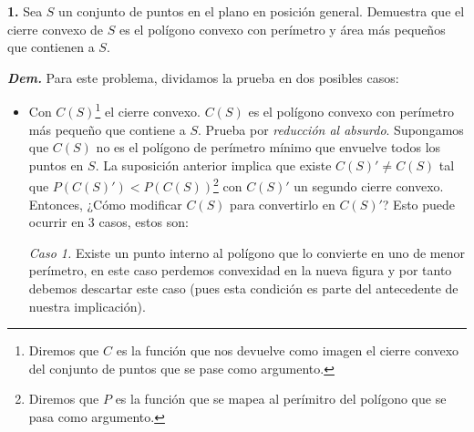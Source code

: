 \textbf{1.} Sea $S$ un conjunto de puntos en el plano en posición general. Demuestra que el
cierre convexo de $S$ es el polígono convexo con perímetro y área más pequeños que contienen a $S$.
\newline

\textbf{\textit{Dem.}} Para este problema, dividamos la prueba en dos posibles casos:
\begin{itemize}
\item Con $C(S)$\footnote{Diremos que $C$ es la función que nos devuelve como imagen el cierre convexo del conjunto de puntos
que se pase como argumento.} el cierre convexo. $C(S)$ es el polígono convexo con perímetro más pequeño que contiene a $S$.
  \newline
  Prueba por \textit{reducción al absurdo}. Supongamos que $C(S)$ no es el polígono de perímetro mínimo que envuelve
  todos los puntos en $S$. La suposición anterior implica que existe $C(S)' \not= C(S)$ tal que $P(C(S)') < P(C(S))$\footnote{Diremos
  que $P$ es la función que se mapea al perímitro del polígono que se pasa como argumento.} con $C(S)'$ un segundo cierre convexo. Entonces,
  ¿Cómo modificar $C(S)$ para convertirlo en $C(S)'$? Esto puede ocurrir en 3 casos, estos son:
  \newline
  
  \hspace*{0.5cm} \textit{Caso 1.} Existe un punto interno al polígono que lo convierte en uno de menor perímetro,
  en este caso perdemos convexidad en la nueva figura y por tanto debemos descartar este caso (pues esta condición es parte
  del antecedente de nuestra implicación).
  \begin{figure}[ht!]
    \centering
  \end{figure}
  

\end{itemize}
